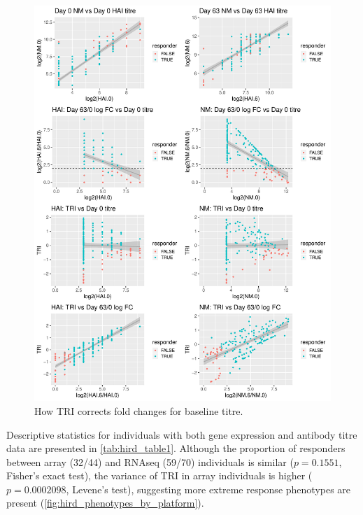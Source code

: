 \begin{figure}
    \includegraphics[width=1.0\textwidth]{mainmatter/figures/chapter_02/phenotype_data_setup.tri_comparison.pdf}
    \caption{How TRI corrects fold changes for baseline titre.}
    \label{fig:hird_tri}
\end{figure} 

Descriptive statistics for individuals with both gene expression and antibody titre data are presented in \autoref{tab:hird_table1}.
Although the proportion of responders between array (32/44) and \gls{RNAseq} (59/70) individuals is similar ($p = 0.1551$, Fisher's exact test), the variance of \gls{TRI} in array individuals is higher ($p = 0.0002098$, Levene's test), suggesting more extreme response phenotypes are present (\autoref{fig:hird_phenotypes_by_platform}).



